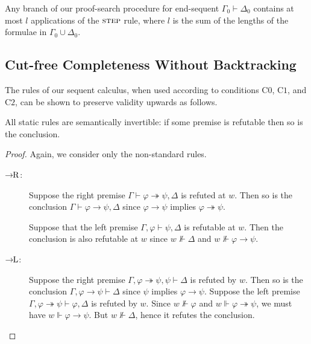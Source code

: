 \documentclass[envcountsect,envcountsame]{llncs}
\newcommand{\condzero}{\mathrm{C0}}
\newcommand{\condone}{\mathrm{C1}}
\newcommand{\condtwo}{\mathrm{C2}}
\newcommand{\forces}{\Vdash}
\newcommand{\iimp}{\twoheadrightarrow}
\newcommand{\limp}{\rightarrow}
\newcommand{\seq}{\vdash}
\newcommand{\impleftrulename}{\small \limp\!\!\mathrm{L}}
\newcommand{\imprightrulename}{\small \limp\!\!\mathrm{R}}
\newcommand{\steprulename}{\textsc{step}}
\begin{document}
\begin{corollary}\label{cor:onlylsteprules}
  Any branch of our proof-search procedure for end-sequent 
  $\Gamma_0\seq\Delta_0$ contains at most $l$ applications of the 
  $\steprulename$ rule, where $l$ is the sum of the lengths of the
  formulae in $\Gamma_0 \cup \Delta_0$. 
\end{corollary}


\subsection{Cut-free Completeness Without Backtracking}

The rules of our sequent calculus,
when used according to conditions $\condzero$, $\condone$, and $\condtwo$,
can be shown to preserve validity upwards
as follows.

\begin{lemma}\label{lemma-invertibility-static-rules}
  All static rules are semantically invertible: if some premise is refutable
  then so is the conclusion.
\end{lemma}
\begin{proof}
  Again, we consider only the non-standard rules.
  \begin{description}
  \item[$\imprightrulename$:] Suppose the right premise
   $\Gamma \seq \varphi\iimp\psi , \Delta $ is refuted at $w$.
   Then so is the conclusion
   $\Gamma \seq \varphi\limp\psi , \Delta $ 
   since $\varphi\limp\psi$ implies 
   $\varphi\iimp\psi$.

   Suppose that the left premise
   $\Gamma , \varphi \seq \psi , \Delta$ is refutable at $w$.
   Then the conclusion is also refutable at $w$ since $w\not\forces
   \Delta$ and $w \not\forces \varphi\limp\psi$.

  \item[$\impleftrulename$:] Suppose the right premise 
   $\Gamma , \varphi\iimp\psi, \psi \seq \Delta$
   is refuted by $w$. Then so is the conclusion 
   $\Gamma , \varphi\limp\psi \seq \Delta$
   since $\psi$ implies
   $\varphi\limp\psi$.
Suppose the left premise 
   $\Gamma , \varphi\iimp\psi \seq \varphi, \Delta$
   is refuted by $w$. Since $w \not\forces
   \varphi$ and $w \forces \varphi\iimp\psi$, we must have
   $w \forces \varphi\limp\psi$. But $w \not\forces\Delta$, hence it
   refutes the conclusion.
  \end{description}
\end{proof}
\end{document}
